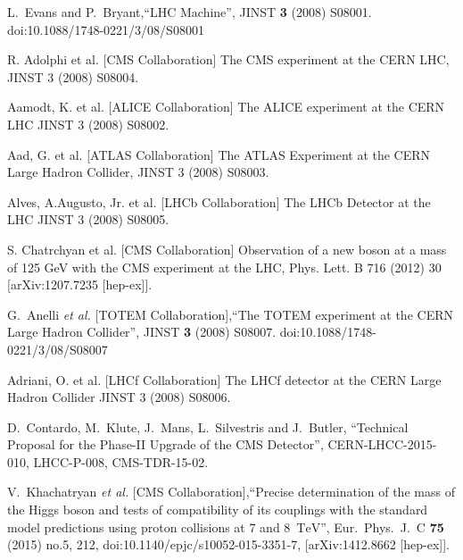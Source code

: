 \begin{thebibliography}{1}
 L.~Evans and P.~Bryant,``LHC Machine'',  JINST {\bf 3} (2008) S08001.  doi:10.1088/1748-0221/3/08/S08001
  
 R. Adolphi et al. [CMS Collaboration] The CMS experiment at the CERN LHC,
JINST 3 (2008) S08004.

 Aamodt, K. et al. [ALICE Collaboration] The ALICE experiment at the CERN
LHC JINST 3 (2008) S08002.

Aad, G. et al. [ATLAS Collaboration] The ATLAS Experiment at the CERN Large
Hadron Collider, JINST 3 (2008) S08003. 

Alves, A.Augusto, Jr. et al. [LHCb Collaboration] The LHCb Detector at the LHC
JINST 3 (2008) S08005.

 S. Chatrchyan et al. [CMS Collaboration] Observation of a new boson at a mass of 125 GeV with the CMS experiment at the LHC, Phys. Lett. B 716 (2012) 30 [arXiv:1207.7235 [hep-ex]].

 G.~Anelli {\it et al.} [TOTEM Collaboration],``The TOTEM experiment at the CERN Large Hadron Collider'', JINST {\bf 3} (2008) S08007. doi:10.1088/1748-0221/3/08/S08007

Adriani, O. et al. [LHCf Collaboration] The LHCf detector at the CERN Large
Hadron Collider JINST 3 (2008) S08006.

 D.~Contardo, M.~Klute, J.~Mans, L.~Silvestris and J.~Butler, ``Technical Proposal for the Phase-II Upgrade of the CMS Detector'',  CERN-LHCC-2015-010, LHCC-P-008, CMS-TDR-15-02.

  V.~Khachatryan {\it et al.} [CMS Collaboration],``Precise determination of the mass of the Higgs boson and tests of compatibility of its couplings with the standard model predictions using proton collisions at 7 and 8 $\,\text {TeV}$'', Eur.\ Phys.\ J.\ C {\bf 75} (2015) no.5,  212,
  doi:10.1140/epjc/s10052-015-3351-7, [arXiv:1412.8662 [hep-ex]].


\end{thebibliography}
